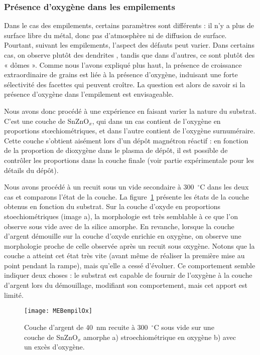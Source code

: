 {{	\subsubsection{Présence d'oxygène dans les empilements}
Dans le cas des empilements, certains paramètres sont différents : il n’y a plus de surface libre du métal, donc pas d’atmosphère ni de diffusion de surface. Pourtant, suivant les empilements, l’aspect des défauts peut varier. Dans certains cas, on observe plutôt des \og dendrites \fg, tandis que dans d’autres, ce sont plutôt des « dômes ». Comme nous l’avons expliqué plus haut, la présence de croissance extraordinaire de grains est liée à la présence d’oxygène, induisant une forte sélectivité des facettes qui peuvent croître. La question est alors de savoir si la présence d’oxygène dans l’empilement est envisageable.\par 
Nous avons donc procédé à une expérience en faisant varier la nature du substrat. C’est une couche de SnZnO$_x$, qui dans un cas contient de l’oxygène en proportions stœchiométriques, et dans l’autre contient de l’oxygène surnuméraire. Cette couche s’obtient aisément lors d’un dépôt magnétron réactif : en fonction de la proportion de dioxygène dans le plasma de dépôt, il est possible de contrôler les proportions dans la couche finale (voir partie expérimentale pour les détails du dépôt).\par 
Nous avons procédé à un recuit sous un vide secondaire à 300~$^\circ$C dans les deux cas et comparons l’état de la couche. La figure~\ref{MEBempilOx} présente les états de la couche obtenus en fonction du substrat. Sur la couche d’oxyde en proportions stoechiométriques (image a), la morphologie est très semblable à ce que l’on observe sous vide avec de la silice amorphe. En revanche, lorsque la couche d’argent démouille sur la couche d’oxyde enrichie en oxygène, on observe une morphologie proche de celle observée après un recuit sous oxygène. Notons que la couche a atteint cet état très vite (avant même de réaliser la première mise au point pendant la rampe), mais qu’elle a cessé d’évoluer. Ce comportement semble indiquer deux choses : le substrat est capable de fournir de l’oxygène à la couche d’argent lors du démouillage, modifiant son comportement, mais cet apport est limité.\par 
{}
\begin{figure}[!htb]
\centering
\texttt{[image: MEBempilOx]}
\caption{Couche d’argent de 40~nm recuite à 300~$^\circ$C sous vide sur une couche de SnZnO$_x$ amorphe a) stroechiométrique en oxygène b) avec un excès d'oxygène.}
\label{MEBempilOx}
\end{figure}
}}
